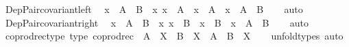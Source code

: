 \begin{isabellebody}
\isanewline
%
\endisadelimproof
\isanewline
{}\isamarkupfalse%
\ Dep{\isacharunderscore}{\kern0pt}Pair{\isacharunderscore}{\kern0pt}covariant{\isacharunderscore}{\kern0pt}left{\isacharcolon}{\kern0pt}\isanewline
\ \ {\isachardoublequoteopen}x\ {\isacharcolon}{\kern0pt}\ A\ {\isasymCoprod}\ B\ {\isasymLongrightarrow}\ {\isacharparenleft}{\kern0pt}{\isasymAnd}x{\isachardot}{\kern0pt}\ x\ {\isacharcolon}{\kern0pt}\ A\ {\isasymLongrightarrow}\ x\ {\isacharcolon}{\kern0pt}\ A{\isacharprime}{\kern0pt}{\isacharparenright}{\kern0pt}\ {\isasymLongrightarrow}\ x\ {\isacharcolon}{\kern0pt}\ A{\isacharprime}{\kern0pt}\ {\isasymCoprod}\ B{\isachardoublequoteclose}\isanewline
%
\isadelimproof
\ \ %
\endisadelimproof
%
\isatagproof
{}\isamarkupfalse%
\ auto%
\endisatagproof
{\isafoldproof}%
%
\isadelimproof
\isanewline
%
\endisadelimproof
\isanewline
{}\isamarkupfalse%
\ Dep{\isacharunderscore}{\kern0pt}Pair{\isacharunderscore}{\kern0pt}covariant{\isacharunderscore}{\kern0pt}right{\isacharcolon}{\kern0pt}\isanewline
\ \ {\isachardoublequoteopen}x\ {\isacharcolon}{\kern0pt}\ A\ {\isasymCoprod}\ B\ {\isasymLongrightarrow}\ {\isacharparenleft}{\kern0pt}{\isasymAnd}x{\isachardot}{\kern0pt}\ x\ {\isacharcolon}{\kern0pt}\ B\ {\isasymLongrightarrow}\ x\ {\isacharcolon}{\kern0pt}\ B{\isacharprime}{\kern0pt}{\isacharparenright}{\kern0pt}\ {\isasymLongrightarrow}\ x\ {\isacharcolon}{\kern0pt}\ A\ {\isasymCoprod}\ B{\isacharprime}{\kern0pt}{\isachardoublequoteclose}\isanewline
%
\isadelimproof
\ \ %
\endisadelimproof
%
\isatagproof
{}\isamarkupfalse%
\ auto%
\endisatagproof
{\isafoldproof}%
%
\isadelimproof
\isanewline
%
\endisadelimproof
\isanewline
{}\isamarkupfalse%
\ coprod{\isacharunderscore}{\kern0pt}rec{\isacharunderscore}{\kern0pt}type\ {\isacharbrackleft}{\kern0pt}type{\isacharbrackright}{\kern0pt}{\isacharcolon}{\kern0pt}\ {\isachardoublequoteopen}coprod{\isacharunderscore}{\kern0pt}rec\ {\isacharcolon}{\kern0pt}\ {\isacharparenleft}{\kern0pt}A\ {\isasymRightarrow}\ X{\isacharparenright}{\kern0pt}\ {\isasymRightarrow}\ {\isacharparenleft}{\kern0pt}B\ {\isasymRightarrow}\ X{\isacharparenright}{\kern0pt}\ {\isasymRightarrow}\ {\isacharparenleft}{\kern0pt}A\ {\isasymCoprod}\ B{\isacharparenright}{\kern0pt}\ {\isasymRightarrow}\ X{\isachardoublequoteclose}\isanewline
%
\isadelimproof
\ \ %
\endisadelimproof
%
\isatagproof
{}\isamarkupfalse%
\ unfold{\isacharunderscore}{\kern0pt}types\ auto%
\endisatagproof
{\isafoldproof}%
%
\isadelimproof
\isanewline
%
\endisadelimproof
\isanewline
{}\isamarkupfalse%

\end{isabellebody}
